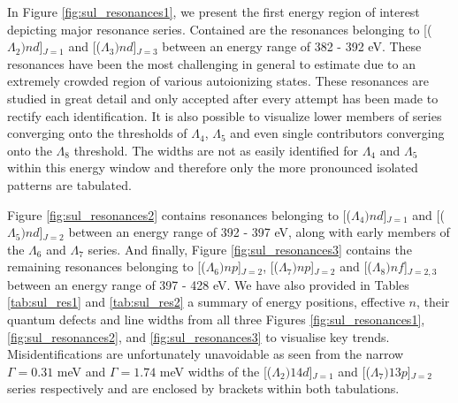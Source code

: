 In Figure \ref{fig:sul_resonances1}, we present the first energy region of interest depicting major resonance series. Contained are the resonances belonging to [($\Lambda_2)nd$]$_{J=1}$ and [($\Lambda_3)nd$]$_{J=3}$ between an energy range of 382 - 392 eV. These resonances have been the most challenging in general to estimate due to an extremely crowded region of various autoionizing states. These resonances are studied in great detail and only accepted after every attempt has been made to rectify each identification. It is also possible to visualize lower members of series converging onto the thresholds of $\Lambda_4$, $\Lambda_5$ and even single contributors converging onto the $\Lambda_8$ threshold. The widths are not as easily identified for $\Lambda_4$ and $\Lambda_5$ within this energy window and therefore only the more pronounced isolated patterns are tabulated. 

Figure \ref{fig:sul_resonances2} contains resonances belonging to [($\Lambda_4)nd$]$_{J=1}$ and [($\Lambda_5)nd$]$_{J=2}$ between an energy range of 392 - 397 eV, along with early members of the $\Lambda_6$ and $\Lambda_7$ series. And finally, Figure \ref{fig:sul_resonances3} contains the remaining resonances belonging to [($\Lambda_6)np$]$_{J=2}$, [($\Lambda_7)np$]$_{J=2}$ and [($\Lambda_8)nf$]$_{J=2,3}$ between an energy range of 397 - 428 eV. We have also provided in Tables \ref{tab:sul_res1} and \ref{tab:sul_res2} a summary of energy positions, effective $n$, their quantum defects and line widths from all three Figures \ref{fig:sul_resonances1}, \ref{fig:sul_resonances2}, and \ref{fig:sul_resonances3} to visualise key trends.  Misidentifications are unfortunately unavoidable as seen from the narrow $\Gamma = 0.31$ meV and $\Gamma = 1.74$ meV widths of the [($\Lambda_2)14d$]$_{J=1}$ and  [($\Lambda_7)13p$]$_{J=2}$ series respectively and are enclosed by brackets within both tabulations. 

                           
